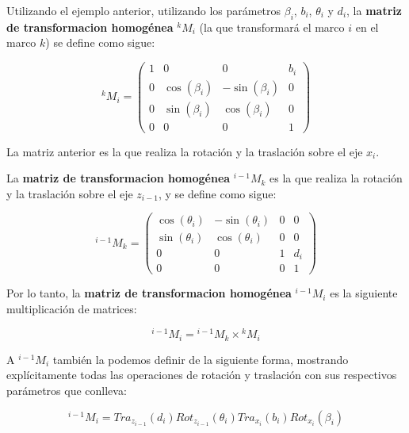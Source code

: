 Utilizando el ejemplo anterior, utilizando los parámetros $\beta_i$, $b_i$, $\theta_i$ y $d_i$, la \textbf{matriz de transformacion homogénea} ${}^kM_i$ (la que transformará el marco $i$ en el marco $k$) se define como sigue:

\begin{equation}
    {}^kM_i = \begin{pmatrix}
                    1 & 0 & 0 & b_i \\
                    0 & \cos(\beta_i) & -\sin(\beta_i) & 0 \\
                    0 & \sin(\beta_i) & \cos(\beta_i) & 0 \\
                    0 & 0 & 0 & 1 
                    \end{pmatrix}
\end{equation}

La matriz anterior es la que realiza la rotación y la traslación sobre el eje $x_i$. 

La \textbf{matriz de transformacion homogénea} ${}^{i-1}M_k$ es la que realiza la rotación y la traslación sobre el eje $z_{i-1}$, y se define como sigue:

\begin{equation}
    {}^{i-1}M_k = \begin{pmatrix}
                    \cos(\theta_i) & -\sin(\theta_i) & 0 & 0 \\
                    \sin(\theta_i) & \cos(\theta_i) & 0 & 0 \\
                    0 & 0 & 1 & d_i \\
                    0 & 0 & 0 & 1 
                    \end{pmatrix}
\end{equation}

Por lo tanto, la \textbf{matriz de transformacion homogénea} ${}^{i-1}M_i$ es la siguiente multiplicación de matrices:

\begin{equation}
    {}^{i-1}M_i = {}^{i-1}M_k\times{}^kM_i
\end{equation}

A ${}^{i-1}M_i$ también la podemos definir de la siguiente forma, mostrando explícitamente todas las operaciones de rotación y traslación con sus respectivos parámetros que conlleva:

\begin{equation}
    {}^{i-1}M_i = Tra_{z_{i-1}}(d_i) Rot_{z_{i-1}}(\theta_i) Tra_{x_{i}}(b_i) Rot_{x_{i}}(\beta_i)
\end{equation}

